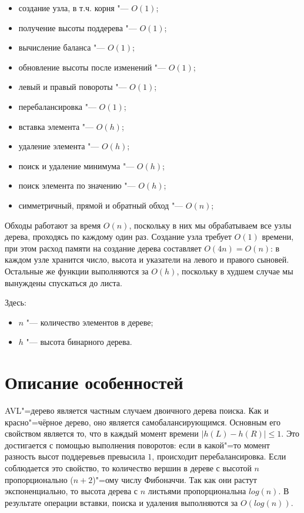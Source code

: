 \documentclass[otchet]{../SCWorks}
\begin{document}
\begin{itemize}
	\item создание узла, в т.ч. корня "--- $O(1)$;
	\item получение высоты поддерева "--- $O(1)$;
	\item вычисление баланса "--- $O(1)$;
	\item обновление высоты после изменений "--- $O(1)$;
	\item левый и правый повороты "--- $O(1)$;
	\item перебалансировка "--- $O(1)$;
	\item вставка элемента "--- $O(h)$;
	\item удаление элемента "--- $O(h)$;
	\item поиск и удаление минимума "--- $O(h)$;
	\item поиск элемента по значению "--- $O(h)$;
	\item симметричный, прямой и обратный обход "--- $O(n)$;
\end{itemize}

Обходы работают за время $O(n)$, поскольку в них мы обрабатываем все узлы дерева, проходясь по каждому один раз. Создание узла требует $O(1)$ времени, при этом расход памяти на создание дерева составляет $O(4n) = O(n)$: в каждом узле хранится число, высота и указатели на левого и правого сыновей. Остальные же функции выполняются за $O(h)$, поскольку в худшем случае мы вынуждены спускаться до листа.

Здесь:
\begin{itemize}
	\item[$\bullet$] $n$ "--- количество элементов в дереве;
	\item[$\bullet$] $h$ "--- высота бинарного дерева.
\end{itemize}

\section{Описание особенностей}

AVL"=дерево является частным случаем двоичного дерева поиска. Как и красно"=чёрное дерево, оно является самобалансирующимся. Основным его свойством является то, что в каждый момент времени $|h(L) - h(R)| \leq 1$. Это достигается с помощью выполнения поворотов: если в какой"=то момент разность высот поддеревьев превысила $1$, происходит перебалансировка. Если соблюдается это свойство, то количество вершин в дереве с высотой $n$ пропорционально ($n + 2$)"=ому числу Фибоначчи. Так как они растут экспоненциально, то высота дерева с $n$ листьями пропорциональна $log(n)$. В результате операции вставки, поиска и удаления выполняются за $O(log(n))$.






\appendix
\end{document}
